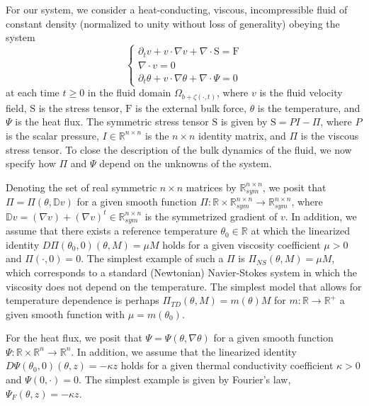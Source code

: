 \documentclass[11pt,letterpaper,reqno]{amsart}
\numberwithin{equation}{section}
\begin{document}
For our system, we consider a heat-conducting, viscous, incompressible fluid of constant density (normalized to unity without loss of generality) obeying the system 
\begin{equation}\label{NSF_general}
\begin{cases}
    \partial_{t}v+v \cdot \nabla v + \nabla\cdot \mathrm{S}=\mathrm{F}  \\
    \nabla \cdot v = 0 \\ 
    \partial_{t}\theta+ v \cdot \nabla \theta + \nabla \cdot \Psi  = 0
\end{cases}
\end{equation}
at each time  \(t \geq 0\) in the fluid domain $\Omega_{b+\zeta(\cdot,t)}$, where \(v\) is the fluid velocity field,  \(\mathrm{S}\) is the stress tensor, \(\mathrm{F}\) is the external bulk force, $\theta$ is the temperature, and $\Psi$ is the heat flux.   The symmetric stress tensor \(\mathrm{S}\) is given by $\mathrm{S}=P I- \Pi$, where \(P\) is the scalar pressure, \(I \in \mathbb{R}^{n \times n}\) is the \(n \times n\) identity matrix, and \(\Pi\) is the viscous stress tensor.  To close the description of the bulk dynamics of the fluid, we now specify how \(\Pi\) and $\Psi$ depend on the unknowns of the system.  


Denoting the set of real symmetric $n \times n$ matrices by \(\mathbb{R}_{sym}^{n \times n}\), we posit that $\Pi = \Pi(\theta,\mathbb{D} v)$ for a given smooth function \(\Pi: \mathbb{R} \times \mathbb{R}_{sym}^{n \times n} \to \mathbb{R}_{sym}^{n \times n}\), where \(\mathbb{D}v = (\nabla v)+(\nabla v)^{t} \in \mathbb{R}_{sym}^{n \times n}\) is the symmetrized gradient of $v$. In addition, we assume that there exists a reference temperature $\theta_0 \in \mathbb{R}$ at which the linearized identity $D \Pi(\theta_0,0)(\theta,M) = \mu M$ holds for a given viscosity coefficient $\mu >0$ and $\Pi(\cdot,0) =0$. The simplest example of such a $\Pi$ is $\Pi_{NS}(\theta,M) = \mu M$, which corresponds to a standard (Newtonian) Navier-Stokes system in which the viscosity does not depend on the temperature. The simplest model that allows for temperature dependence is perhaps $\Pi_{TD}(\theta,M)= m(\theta) M$ for $m : \mathbb{R} \to \mathbb{R}^+$ a given smooth function with $\mu = m(\theta_0)$.


For the heat flux, we posit that $\Psi = \Psi(\theta,\nabla \theta)$ for a given smooth function $\Psi : \mathbb{R} \times \mathbb{R}^n \to \mathbb{R}^n$. In addition, we assume that the linearized identity $D \Psi(\theta_0,0)(\theta,z) = -\kappa z$ holds for a given thermal conductivity coefficient $\kappa >0$ and $\Psi(0,\cdot)=0$. The simplest example is given by Fourier's law, $\Psi_F(\theta,z) = -\kappa z$.
\end{document}
